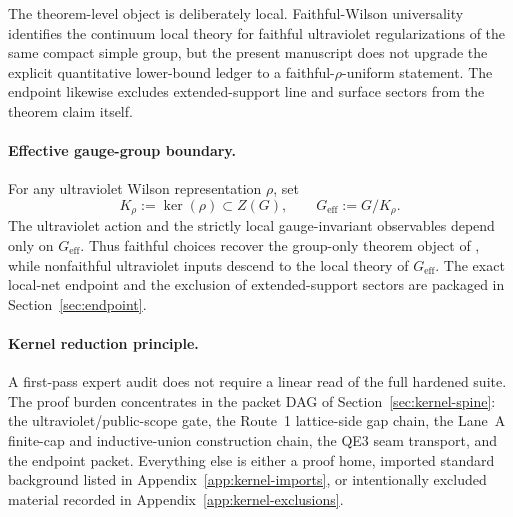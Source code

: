 The theorem-level object is deliberately local. Faithful-Wilson universality identifies the continuum local theory for faithful ultraviolet regularizations of the same compact simple group, but the present manuscript does not upgrade the explicit quantitative lower-bound ledger to a faithful-$\rho$-uniform statement. The endpoint likewise excludes extended-support line and surface sectors from the theorem claim itself.




\paragraph{Effective gauge-group boundary.}
For any ultraviolet Wilson representation $\rho$, set
\[
  K_\rho:=\ker(\rho)\subset Z(G),\qquad G_{\mathrm{eff}}:=G/K_\rho.
\]
The ultraviolet action and the strictly local gauge-invariant observables depend only on $G_{\mathrm{eff}}$. Thus faithful choices recover the group-only theorem object of , while nonfaithful ultraviolet inputs descend to the local theory of $G_{\mathrm{eff}}$. The exact local-net endpoint and the exclusion of extended-support sectors are packaged in Section~\ref{sec:endpoint}.

\paragraph{Kernel reduction principle.}
A first-pass expert audit does not require a linear read of the full hardened suite. The proof burden concentrates in the packet DAG of Section~\ref{sec:kernel-spine}: the ultraviolet/public-scope gate, the Route~1 lattice-side gap chain, the Lane~A finite-cap and inductive-union construction chain, the QE3 seam transport, and the endpoint packet. Everything else is either a proof home, imported standard background listed in Appendix~\ref{app:kernel-imports}, or intentionally excluded material recorded in Appendix~\ref{app:kernel-exclusions}.

